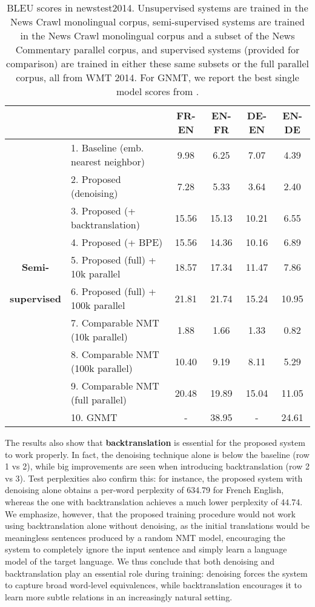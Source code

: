 \documentclass{article} \usepackage{iclr2018_conference,times}
\begin{document}
\begin{table*}[t]
\caption{BLEU scores in newstest2014. Unsupervised systems are trained in the News Crawl monolingual corpus, semi-supervised systems are trained in the News Crawl monolingual corpus and a subset of the News Commentary parallel corpus, and supervised systems (provided for comparison) are trained in either these same subsets or the full parallel corpus, all from WMT 2014. For GNMT, we report the best single model scores from \citet{wu2016google}.} \label{tab:results}
\begin{center}
  \begin{tabular}{clcccc}
    \toprule
    & & \bf FR-EN & \bf EN-FR & \bf DE-EN & \bf EN-DE \\
    \midrule
    \bf \multirow{4}{*}{Unsupervised} & 1. Baseline (emb. nearest neighbor) & 9.98 & 6.25 & 7.07 & 4.39 \\
    & 2. Proposed (denoising) & 7.28 & 5.33 & 3.64 & 2.40 \\
    & 3. Proposed (+ backtranslation) & 15.56 & 15.13 & 10.21 & 6.55 \\
    & 4. Proposed (+ BPE) & 15.56 & 14.36 & 10.16 & 6.89 \\
    \midrule
    \bf Semi- & 5. Proposed (full) + 10k parallel & 18.57 & 17.34 & 11.47 & 7.86 \\
    \bf supervised & 6. Proposed (full) + 100k parallel & 21.81 & 21.74 & 15.24 & 10.95 \\
    \midrule
    \bf \multirow{4}{*}{Supervised} & 7. Comparable NMT (10k parallel) & 1.88 & 1.66 & 1.33 & 0.82 \\
    & 8. Comparable NMT (100k parallel) & 10.40 & 9.19 & 8.11 & 5.29 \\
    & 9. Comparable NMT (full parallel) & 20.48 & 19.89 & 15.04 & 11.05 \\
    & 10. GNMT \citep{wu2016google} & - & 38.95 & - & 24.61 \\
    \bottomrule
  \end{tabular}
\end{center}
\end{table*}

The results also show that \textbf{backtranslation} is essential for the proposed system to work properly. In fact, the denoising technique alone is below the baseline (row 1 vs 2), while big improvements are seen when introducing backtranslation (row 2 vs 3). Test perplexities also confirm this: for instance, the proposed system with denoising alone obtains a per-word perplexity of 634.79 for French  English, whereas the one with backtranslation achieves a much lower perplexity of 44.74. We emphasize, however, that the proposed training procedure would not work using backtranslation alone without denoising, as the initial translations would be meaningless sentences produced by a random NMT model, encouraging the system to completely ignore the input sentence and simply learn a language model of the target language. We thus conclude that both denoising and backtranslation play an essential role during training: denoising forces the system to capture broad word-level equivalences, while backtranslation encourages it to learn more subtle relations in an increasingly natural setting.
\end{document}
